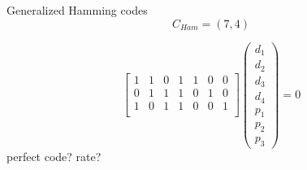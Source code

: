 \begin{frame}{Generalized Hamming codes}
  \[
	C_{Ham} = (7,4)
  \]

  \[
	\begin{bmatrix}
	  1 & 1 & 0 & 1 & 1 & 0 & 0 \\
	  0 & 1 & 1 & 1 & 0 & 1 & 0 \\
	  1 & 0 & 1 & 1 & 0 & 0 & 1 \\
	\end{bmatrix} \begin{pmatrix}
      d_1 \\ d_2 \\ d_3 \\ d_4 \\ p_1 \\ p_2 \\ p_3
	\end{pmatrix}
	= 0
  \]
  perfect code?
  rate?
\end{frame}
